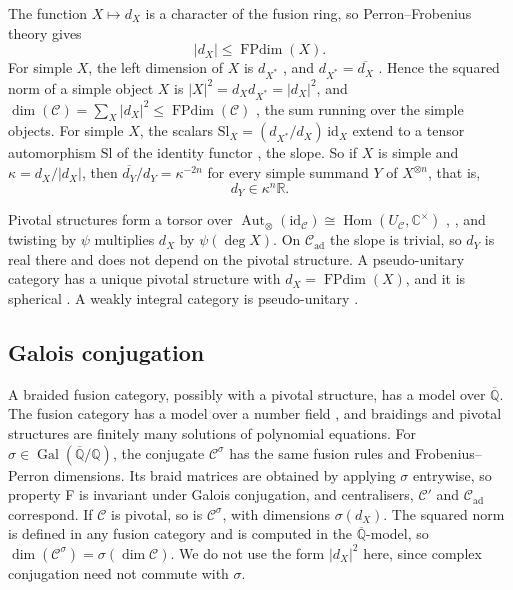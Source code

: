 \documentclass[11pt,oneside]{amsart}
\theoremstyle{remark}
\newcommand{\C}{\mathcal C}
\newcommand{\FP}{\operatorname{FPdim}}
\newcommand{\Hom}{\operatorname{Hom}}
\newcommand{\Aut}{\operatorname{Aut}}
\newcommand{\id}{\mathrm{id}}
\newcommand{\Qb}{\overline{\mathbb Q}}
\newcommand{\ad}{\mathrm{ad}}
\newcommand{\Gal}{\operatorname{Gal}}
\begin{document}
The function $X\mapsto d_X$ is a character of the fusion ring, so
Perron--Frobenius theory gives
\[
|d_X|\le\FP(X).
\]
For simple $X$, the left dimension of $X$ is $d_{X^*}$ \cite[\S2]{La}, and
$d_{X^*}=\overline{d_X}$ \cite[Proposition~2.9]{ENO}. Hence the squared norm of a
simple object $X$ is $|X|^2=d_Xd_{X^*}=|d_X|^2$, and
$\dim(\C)=\sum_X|d_X|^2\le\FP(\C)$ \cite[Proposition~8.21]{ENO}, the sum running
over the simple objects. For simple $X$, the scalars
$\mathrm{Sl}_X=(d_{X^*}/d_X)\,\id_X$ extend to a tensor automorphism $\mathrm{Sl}$
of the identity functor \cite[proof of Proposition~2.13]{La}, the slope. So if $X$
is simple and $\kappa=d_X/|d_X|$, then $\overline{d_Y}/d_Y=\kappa^{-2n}$ for
every simple summand $Y$ of $X^{\otimes n}$, that is,
\begin{equation}\label{eq:phase}
d_Y\in\kappa^n\mathbb R .
\end{equation}

Pivotal structures form a torsor over
$\Aut_\otimes(\id_\C)\cong\Hom(U_\C,\mathbb C^\times)$ \cite[Exercise~4.7.16]{EGNO},
\cite[Proposition~2.3]{DGNO}, and twisting by $\psi$ multiplies $d_X$ by
$\psi(\deg X)$. On $\C_\ad$ the slope is trivial, so $d_Y$ is real there and
does not depend on the pivotal structure. A pseudo-unitary category has a
unique pivotal structure with $d_X=\FP(X)$, and it is spherical
\cite[Proposition~8.23]{ENO}. A weakly integral category is pseudo-unitary
\cite[Proposition~8.24]{ENO}.

\subsection{Galois conjugation}\label{ssec:galois}
A braided fusion category, possibly with a pivotal structure, has a model over
$\Qb$. The fusion category has a model over a number field
\cite[Theorem~2.30 and Remark~2.33]{ENO}, and braidings and pivotal structures are finitely many
solutions of polynomial equations. For $\sigma\in\Gal(\Qb/\mathbb Q)$, the
conjugate $\C^\sigma$ has the same fusion rules and Frobenius--Perron
dimensions. Its braid matrices are obtained by applying $\sigma$ entrywise, so
property F is invariant under Galois conjugation, and centralisers, $\C'$ and
$\C_\ad$ correspond. If $\C$ is pivotal, so is $\C^\sigma$, with dimensions
$\sigma(d_X)$. The squared norm is defined in any fusion category
\cite[\S2]{ENO} and is computed in the $\Qb$-model, so
$\dim(\C^\sigma)=\sigma(\dim\C)$. We do not use the form $|d_X|^2$ here, since
complex conjugation need not commute with $\sigma$.
\end{document}
